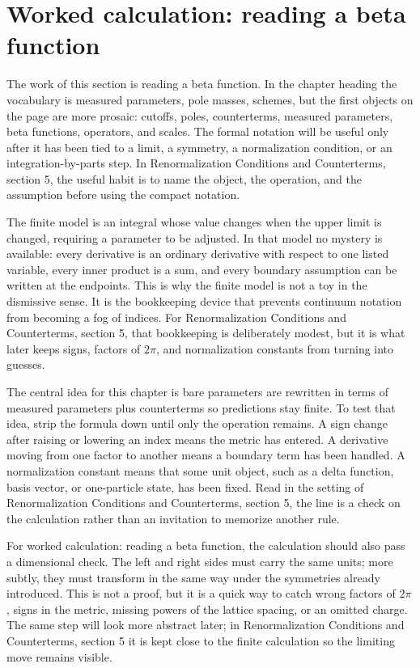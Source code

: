 \section{Worked calculation: reading a beta function}

The work of this section is reading a beta function.  In the chapter heading the vocabulary is measured parameters, pole masses, schemes, but the first objects on the page are more prosaic: cutoffs, poles, counterterms, measured parameters, beta functions, operators, and scales.  The formal notation will be useful only after it has been tied to a limit, a symmetry, a normalization condition, or an integration-by-parts step.  In Renormalization Conditions and Counterterms, section 5, the useful habit is to name the object, the operation, and the assumption before using the compact notation.

The finite model is an integral whose value changes when the upper limit is changed, requiring a parameter to be adjusted.  In that model no mystery is available: every derivative is an ordinary derivative with respect to one listed variable, every inner product is a sum, and every boundary assumption can be written at the endpoints.  This is why the finite model is not a toy in the dismissive sense.  It is the bookkeeping device that prevents continuum notation from becoming a fog of indices.  For Renormalization Conditions and Counterterms, section 5, that bookkeeping is deliberately modest, but it is what later keeps signs, factors of \(2\pi\), and normalization constants from turning into guesses.

The central idea for this chapter is bare parameters are rewritten in terms of measured parameters plus counterterms so predictions stay finite.  To test that idea, strip the formula down until only the operation remains.  A sign change after raising or lowering an index means the metric has entered.  A derivative moving from one factor to another means a boundary term has been handled.  A normalization constant means that some unit object, such as a delta function, basis vector, or one-particle state, has been fixed.  Read in the setting of Renormalization Conditions and Counterterms, section 5, the line is a check on the calculation rather than an invitation to memorize another rule.

For worked calculation: reading a beta function, the calculation should also pass a dimensional check.  The left and right sides must carry the same units; more subtly, they must transform in the same way under the symmetries already introduced.  This is not a proof, but it is a quick way to catch wrong factors of \(2\pi\), signs in the metric, missing powers of the lattice spacing, or an omitted charge.  The same step will look more abstract later; in Renormalization Conditions and Counterterms, section 5 it is kept close to the finite calculation so the limiting move remains visible.

